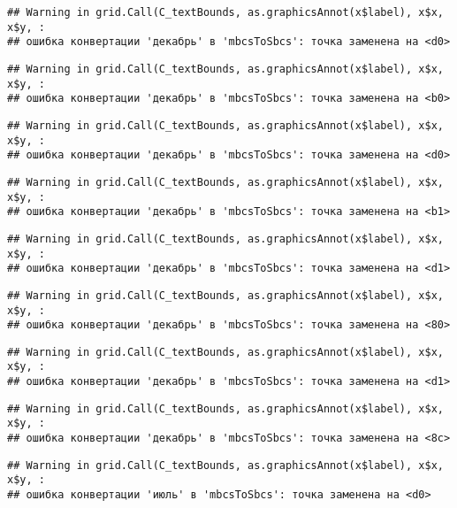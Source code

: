 \documentclass[
]{article}
\begin{document}
\begin{verbatim}
## Warning in grid.Call(C_textBounds, as.graphicsAnnot(x$label), x$x, x$y, :
## ошибка конвертации 'декабрь' в 'mbcsToSbcs': точка заменена на <d0>
\end{verbatim}

\begin{verbatim}
## Warning in grid.Call(C_textBounds, as.graphicsAnnot(x$label), x$x, x$y, :
## ошибка конвертации 'декабрь' в 'mbcsToSbcs': точка заменена на <b0>
\end{verbatim}

\begin{verbatim}
## Warning in grid.Call(C_textBounds, as.graphicsAnnot(x$label), x$x, x$y, :
## ошибка конвертации 'декабрь' в 'mbcsToSbcs': точка заменена на <d0>
\end{verbatim}

\begin{verbatim}
## Warning in grid.Call(C_textBounds, as.graphicsAnnot(x$label), x$x, x$y, :
## ошибка конвертации 'декабрь' в 'mbcsToSbcs': точка заменена на <b1>
\end{verbatim}

\begin{verbatim}
## Warning in grid.Call(C_textBounds, as.graphicsAnnot(x$label), x$x, x$y, :
## ошибка конвертации 'декабрь' в 'mbcsToSbcs': точка заменена на <d1>
\end{verbatim}

\begin{verbatim}
## Warning in grid.Call(C_textBounds, as.graphicsAnnot(x$label), x$x, x$y, :
## ошибка конвертации 'декабрь' в 'mbcsToSbcs': точка заменена на <80>
\end{verbatim}

\begin{verbatim}
## Warning in grid.Call(C_textBounds, as.graphicsAnnot(x$label), x$x, x$y, :
## ошибка конвертации 'декабрь' в 'mbcsToSbcs': точка заменена на <d1>
\end{verbatim}

\begin{verbatim}
## Warning in grid.Call(C_textBounds, as.graphicsAnnot(x$label), x$x, x$y, :
## ошибка конвертации 'декабрь' в 'mbcsToSbcs': точка заменена на <8c>
\end{verbatim}

\begin{verbatim}
## Warning in grid.Call(C_textBounds, as.graphicsAnnot(x$label), x$x, x$y, :
## ошибка конвертации 'июль' в 'mbcsToSbcs': точка заменена на <d0>
\end{verbatim}
\end{document}
